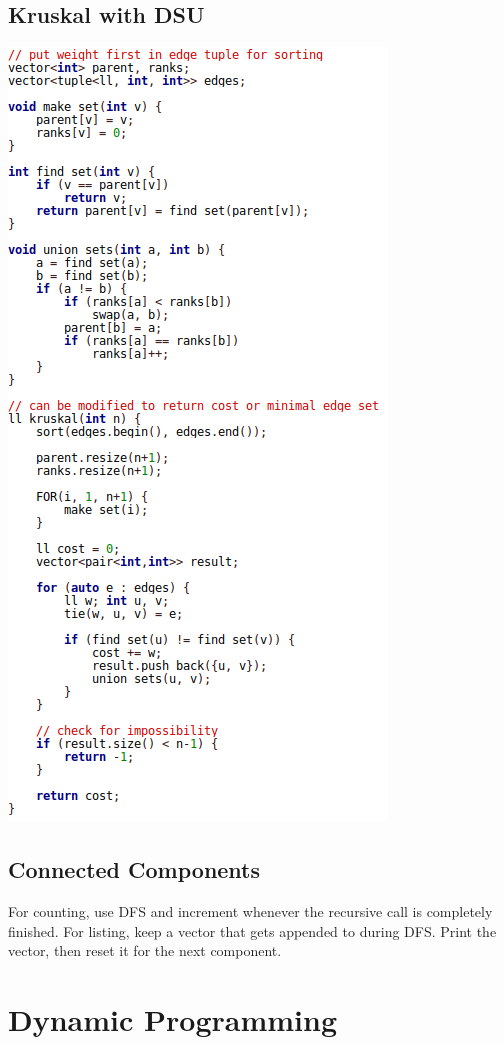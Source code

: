 \documentclass[11pt,twocolumn]{article}
\begin{document}
\subsection{Kruskal with DSU}
\includegraphics[scale=0.5]{kruskal}

\subsection{Connected Components}
For counting, use DFS and increment whenever the recursive call is completely finished. For listing, keep a vector that gets appended to during DFS. Print the vector, then reset it for the next component.

\section{Dynamic Programming}
\end{document}
